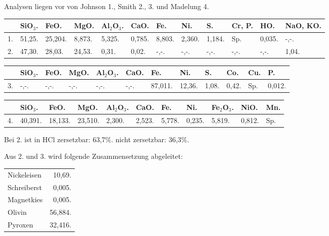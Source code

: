 \documentclass[a4paper, 11pt, oneside]{article}
\begin{document}
Analysen liegen vor von Johnson 1., Smith 2., 3. und Madelung 4.
\begin{table}[H]
    \centering\swabfamily\Large
    \normalsize
    \begin{tabular}{p{3mm} p{5mm} p{6mm} p{6mm} p{6mm} p{5mm} p{5mm} p{5mm} p{5mm} p{10mm} p{5mm} p{15mm}}
         & SiO$_{3}$. & FeO. & MgO. & Al$_{2}$O$_{3}$. & CaO. & Fe. & Ni. & S. & Cr, P. & HO. & NaO, KO. \\ \hline
        1. & 51,25. & 25,204. & 8,873. & 5,325. & 0,785. & 8,803. & 2,360. & 1,184. & Sp. & 0,035. & -,-. \\
        2. & 47,30. & 28,03. & 24,53. & 0,31. & 0,02. & -,-. & -,-. & -,-. & -,-. & -,-. & 1,04. \\
    \end{tabular}
\end{table}

\begin{table}[H]
    \centering\swabfamily\Large
    \normalsize
    \begin{tabular}{p{3mm} p{4mm} p{5mm} p{5mm} p{5mm} p{5mm} p{6mm} p{6mm} p{6mm} p{6mm} p{6mm} p{6mm}}
         & SiO$_{3}$. & FeO. & MgO. & Al$_{2}$O$_{3}$. & CaO. & Fe. & Ni. & S. & Co. & Cu. & P. \\ \hline
        3. & -,-. & -,-. & -,-. & -,-. & -,-. & 87,011. & 12,36. & 1,08. & 0,42. & Sp. & 0,012. \\
    \end{tabular}
\end{table}

\begin{table}[H]
    \centering\swabfamily\Large
    \normalsize
    \begin{tabular}{p{3mm} p{6mm} p{6mm} p{6mm} p{6mm} p{5mm} p{5mm} p{5mm} p{6mm} p{6mm} p{5mm}}
         & SiO$_{3}$. & FeO. & MgO. & Al$_{2}$O$_{3}$. & CaO. & Fe. & Ni. & Fe$_{2}$O$_{3}$. & NiO. & Mn. \\ \hline
        4. & 40,391. & 18,133. & 23,510. & 2,300. & 2,523. & 5,778. & 0,235. & 5,819. & 0,812. & Sp. \\
    \end{tabular}
\end{table}

Bei 2. ist in HCl zersetzbar: 63,7\%. nicht zersetzbar: 36,3\%.

Aus 2. und 3. wird folgende Zusammensetzung abgeleitet:
\begin{table}[H]
    \centering\swabfamily\Large
    \begin{tabular}{l r}
        Nickeleisen & 10,69. \\
        Schreiberst & 0,005. \\
        Magnetkies & 0,005. \\
        Olivin & 56,884. \\
        Pyroxen & 32,416. \\
    \end{tabular}
\end{table}
\end{document}
